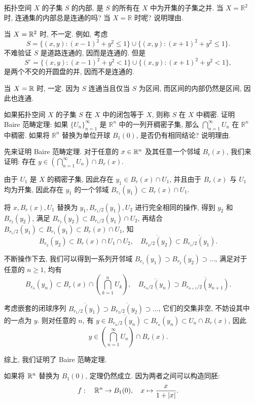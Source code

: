 \documentclass{article}
\begin{document}
\begin{problem}
  拓扑空间 $X$ 的子集 $S$ 的内部, 是 $S$ 的所有在 $X$ 中为开集的子集之并. 当 $X=\mathbb{R}^2$ 时, 连通集的内部总是连通的吗? 当 $X=\mathbb{R}$ 时呢? 说明理由.
\end{problem}

\begin{solution}
	当 $X=\mathbb{R}^2$ 时, 不一定. 例如, 考虑
	\[ S = \{(x,y): (x-1)^2+y^2\leq 1\} \cup \{(x,y): (x+1)^2+y^2 \leq 1\}. \]
	不难验证 $S$ 是道路连通的, 因而是连通的. 但是
	\[ S^\circ = \{(x,y): (x-1)^2+y^2<1\} \cup \{(x,y): (x+1)^2+y^2<1\}, \]
	是两个不交的开圆盘的并, 因而不是连通的.

	当 $X=\mathbb{R}$ 时, 一定. 因为 $S$ 连通当且仅当 $S$ 为区间, 而区间的内部仍然是区间, 因此也连通.
\end{solution}



\begin{problem}
  如果拓扑空间 $X$ 的子集 $S$ 在 $X$ 中的闭包等于 $X$, 则称 $S$ 在 $X$ 中稠密. 证明 Baire 范畴定理: 如果 $\{U_n\}_{n=1}^{\infty}$ 是 $\mathbb{R}^n$ 中的一列开稠密子集, 那么 $\bigcap_{n=1}^{\infty}U_n$ 在 $\mathbb{R}^n$ 中稠密. 如果将 $\mathbb{R}^n$ 替换为单位开球 $B_1(0)$, 是否仍有相同结论? 说明理由.
\end{problem}

\begin{solution}
	先来证明 Baire 范畴定理. 对于任意的 $x\in \mathbb{R}^n$ 及其任意一个邻域 $B_r(x)$, 我们来证明: 存在 $y\in \left( \bigcap_{n=1}^{\infty} U_n \right) \cap B_r(x) $. 

	由于 $U_1$ 是 $X$ 的稠密子集, 因此存在 $y_1\in B_r(x) \cap U_1$, 并且由于 $B_r(x)$ 与 $U_1$ 均为开集, 因此存在 $y_1$ 的一个邻域 $B_{r_1}(y_1) \subset B_r(x) \cap U_1$. 

	将 $x,B_r(x), U_1$ 替换为 $y_1,B_{r_1/2}(y_1),U_2$ 进行完全相同的操作, 得到 $y_2$ 和 $B_{r_2}(y_2)$, 满足 $B_{r_2}(y_2)\subset B_{r_1/2}(y_1) \cap U_2$, 再结合 $B_{r_1/2}(y_1) \subset B_{r_1}(y_1) \subset B_r(x) \cap U_1$, 知
	\[ B_{r_2}(y_2) \subset B_r(x) \cap U_1 \cap U_2, \quad \overline{B_{r_2/2}(y_2)} \subset \overline{B_{r_1/2}(y_1)}. \]
	
	不断操作下去, 我们可以得到一系列开邻域 $B_{r_1}(y_1) \supset B_{r_2}(y_2) \supset \dots$, 满足对于任意的 $n\ge 1$, 均有
	\[ B_{r_n}(y_n) \subset B_r(x) \cap \left( \bigcap_{k=1}^{n} U_k \right), \quad \overline{B_{r_n/2}(y_n)} \supset \overline{B_{r_{n+1}/2}(y_{n+1})}. \]

	考虑嵌套的闭球序列 $\overline{B_{r_1/2}(y_1)} \supset \overline{B_{r_2/2}(y_2)} \supset \dots$, 它们的交集非空, 不妨设其中的一点为 $y$. 则对任意的 $n$, 有 $y \in \overline{B_{r_n/2}(y_n)} \subset B_{r_n}(y_n) \subset U_n\cap B_r(x)$, 因此
	\[ y\in \left( \bigcap_{n=1}^{\infty} U_n \right) \cap B_r(x). \]
	
	综上, 我们证明了 Baire 范畴定理.

	如果将 $\mathbb{R}^n$ 替换为 $B_1(0)$, 定理仍然成立. 因为两者之间可以构造同胚: 
	\[ f: \quad \mathbb{R}^n \to B_1(0),\quad x \mapsto \frac{x}{1+|x|}. \]
\end{solution}
\end{document}
